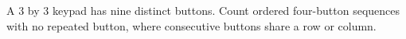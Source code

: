 A 3 by 3 keypad has nine distinct buttons. Count ordered four-button sequences with no repeated button, where consecutive buttons share a row or column.
